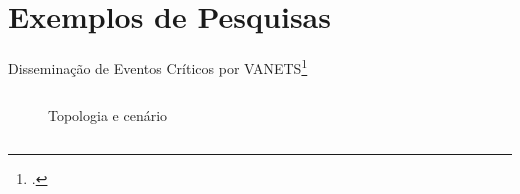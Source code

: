 
\section{Exemplos de Pesquisas}
\begin{frame}{Disseminação de Eventos Críticos por VANETS\footcite{Andrade2021a,Andrade2021b}}
    \begin{columns}
        \begin{column}{0.65\textwidth}
            \begin{figure}
                \centering
                \quad
                \caption{Topologia e cenário}
            \end{figure}    
        \end{column}
        \begin{column}{0.35\textwidth}
            \begin{figure}
                \centering

\end{figure}
\end{column}
\end{columns}
\end{frame}
